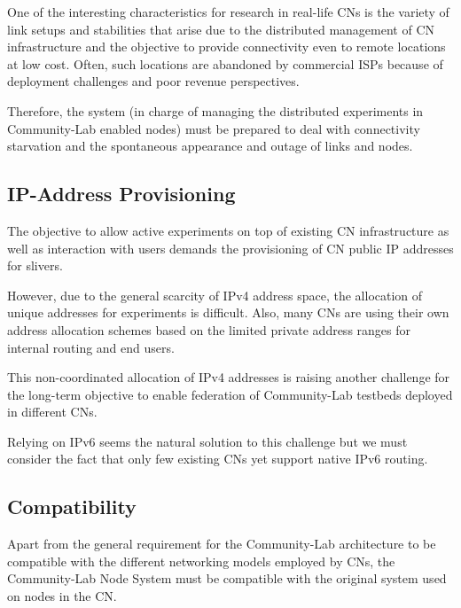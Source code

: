 \documentclass[conference]{IEEEtran}
\begin{document}
One of the interesting characteristics for research in real-life CNs
is the variety of link setups and stabilities that arise due to the
distributed management of CN infrastructure and the objective to provide
connectivity even to remote locations at low cost. Often, such
locations are abandoned by commercial ISPs because of deployment
challenges and poor revenue perspectives.

Therefore, the system (in charge of managing the distributed
experiments in Community-Lab enabled nodes) must be prepared to deal with
connectivity starvation and the spontaneous appearance and outage of
links and nodes.


\subsection{IP-Address Provisioning}

The objective to allow active experiments on top of existing CN
infrastructure as well as interaction with users demands the
provisioning of CN public IP addresses for slivers.

However, due to the general scarcity of IPv4 address space, the
allocation of unique addresses for experiments is difficult. Also,
many CNs are using their own address allocation schemes based on the
limited private address ranges for internal routing and end users.

This non-coordinated allocation of IPv4 addresses is raising another
challenge for the long-term objective to enable federation of Community-Lab
testbeds deployed in different CNs.

Relying on IPv6 seems the natural solution to this challenge but we must
consider the fact that only few existing CNs yet support native IPv6
routing.

\subsection{Compatibility}

Apart from the general requirement for the Community-Lab architecture to be
compatible with the different networking models employed by CNs, the
Community-Lab Node System must be compatible with the original system used on
nodes in the CN.
\end{document}
